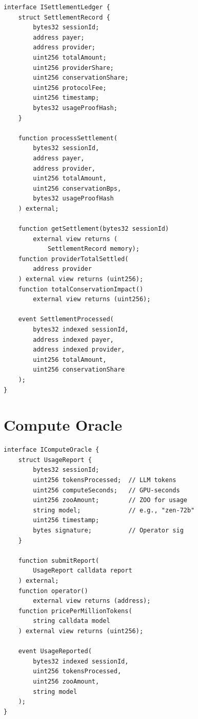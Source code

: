 \documentclass[11pt,letterpaper]{article}
\begin{document}
\begin{lstlisting}[language=Solidity,caption=ISettlementLedger interface]
interface ISettlementLedger {
    struct SettlementRecord {
        bytes32 sessionId;
        address payer;
        address provider;
        uint256 totalAmount;
        uint256 providerShare;
        uint256 conservationShare;
        uint256 protocolFee;
        uint256 timestamp;
        bytes32 usageProofHash;
    }

    function processSettlement(
        bytes32 sessionId,
        address payer,
        address provider,
        uint256 totalAmount,
        uint256 conservationBps,
        bytes32 usageProofHash
    ) external;

    function getSettlement(bytes32 sessionId)
        external view returns (
            SettlementRecord memory);
    function providerTotalSettled(
        address provider
    ) external view returns (uint256);
    function totalConservationImpact()
        external view returns (uint256);

    event SettlementProcessed(
        bytes32 indexed sessionId,
        address indexed payer,
        address indexed provider,
        uint256 totalAmount,
        uint256 conservationShare
    );
}
\end{lstlisting}

\section{Compute Oracle}
\label{sec:oracle}

\begin{lstlisting}[language=Solidity,caption=IComputeOracle interface]
interface IComputeOracle {
    struct UsageReport {
        bytes32 sessionId;
        uint256 tokensProcessed;  // LLM tokens
        uint256 computeSeconds;   // GPU-seconds
        uint256 zooAmount;        // ZOO for usage
        string model;             // e.g., "zen-72b"
        uint256 timestamp;
        bytes signature;          // Operator sig
    }

    function submitReport(
        UsageReport calldata report
    ) external;
    function operator()
        external view returns (address);
    function pricePerMillionTokens(
        string calldata model
    ) external view returns (uint256);

    event UsageReported(
        bytes32 indexed sessionId,
        uint256 tokensProcessed,
        uint256 zooAmount,
        string model
    );
}
\end{lstlisting}
\end{document}
